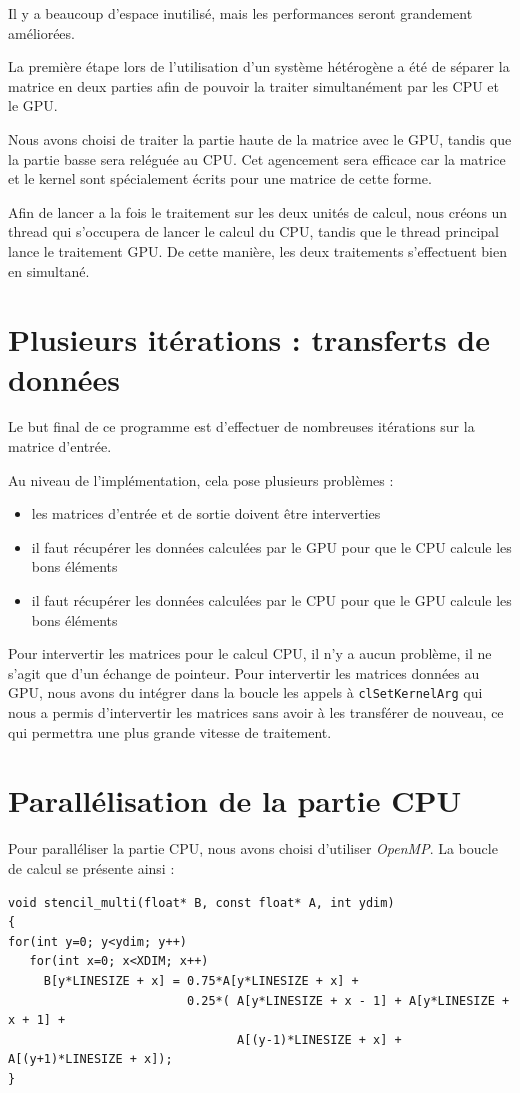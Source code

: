 \documentclass{article}
\begin{document}
Il y a beaucoup d'espace inutilisé, mais les performances seront grandement améliorées.

La première étape lors de l'utilisation d'un système hétérogène a été de séparer la matrice en deux parties afin de pouvoir la traiter simultanément par les CPU et le GPU.

Nous avons choisi de traiter la partie haute de la matrice avec le GPU, tandis que la partie basse sera reléguée au CPU. Cet agencement sera efficace car la matrice et le kernel sont spécialement écrits pour une matrice de cette forme.

Afin de lancer a la fois le traitement sur les deux unités de calcul, nous créons un thread qui s'occupera de lancer le calcul du CPU, tandis que le thread principal lance le traitement GPU.
De cette manière, les deux traitements s'effectuent bien en simultané.

\section{Plusieurs itérations : transferts de données}

Le but final de ce programme est d'effectuer de nombreuses itérations sur la matrice d'entrée.

Au niveau de l'implémentation, cela pose plusieurs problèmes :
\begin{itemize}
\item les matrices d'entrée et de sortie doivent être interverties
\item il faut récupérer les données calculées par le GPU pour que le CPU calcule les bons éléments
\item il faut récupérer les données calculées par le CPU pour que le GPU calcule les bons éléments
\end{itemize}

Pour intervertir les matrices pour le calcul CPU, il n'y a aucun problème, il ne s'agit que d'un échange de pointeur.
Pour intervertir les matrices données au GPU, nous avons du intégrer dans la boucle les appels à \verb+clSetKernelArg+ qui nous a permis d'intervertir les matrices sans avoir à les transférer de nouveau, ce qui permettra une plus grande vitesse de traitement.


\section{Parallélisation de la partie CPU}

Pour paralléliser la partie CPU, nous avons choisi d'utiliser \textit{OpenMP}.
La boucle de calcul se présente ainsi :
\begin{verbatim}
void stencil_multi(float* B, const float* A, int ydim)
{
for(int y=0; y<ydim; y++)
   for(int x=0; x<XDIM; x++)
     B[y*LINESIZE + x] = 0.75*A[y*LINESIZE + x] +
                         0.25*( A[y*LINESIZE + x - 1] + A[y*LINESIZE + x + 1] +
                                A[(y-1)*LINESIZE + x] + A[(y+1)*LINESIZE + x]);
}
\end{verbatim}
\end{document}

